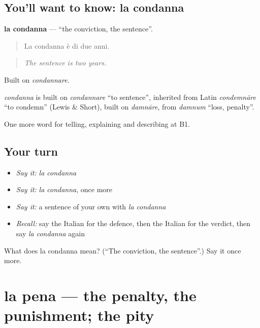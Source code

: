 \subsection*{You'll want to know: la condanna}
\textbf{la condanna} — \textquotedblleft{}the conviction, the sentence\textquotedblright{}.

\begin{quote}
La condanna è di due anni.
\end{quote}

\begin{quote}
\emph{The sentence is two years.}
\end{quote}

Built on \emph{condannare}.

\begin{cousinweb}
\emph{condanna} is built on \emph{condannare} \textquotedblleft{}to sentence\textquotedblright{}, inherited from Latin \emph{condemnāre} \textquotedblleft{}to condemn\textquotedblright{} (Lewis \& Short), built on \emph{damnāre}, from \emph{damnum} \textquotedblleft{}loss, penalty\textquotedblright{}.
\end{cousinweb}

\begin{grammarlens}[title={What you've built}]
One more word for telling, explaining and describing at B1.
\end{grammarlens}

\subsection*{Your turn}
\begin{itemize}
\raggedright
  \item \emph{Say it:} \emph{la condanna}
  \item \emph{Say it:} \emph{la condanna}, once more
  \item \emph{Say it:} a sentence of your own with \emph{la condanna}
  \item \emph{Recall:} say the Italian for the defence, then the Italian for the verdict, then say \emph{la condanna} again
\end{itemize}

\begin{tcolorbox}[breakable,colback=teal!4,colframe=teal!35!black,title={Before you move on}]
What does la condanna mean? (\textquotedblleft{}The conviction, the sentence\textquotedblright{}.) Say it once more.
\end{tcolorbox}
\section[la pena]{la pena — the penalty, the punishment; the pity}

